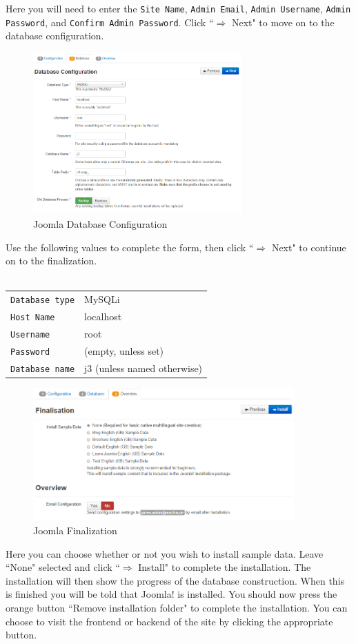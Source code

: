 \documentclass[]{report}
\begin{document}
\noindent
Here you will need to enter the \texttt{Site Name}, \texttt{Admin Email}, \texttt{Admin Username}, \texttt{Admin Password}, and \texttt{Confirm Admin Password}. Click ``$\Rightarrow$ Next" to move on to the database configuration.\\

\begin{figure}[h] 
	\centering
	\includegraphics[width=8cm]{j3databaseconfiguration.png}
	\caption{Joomla Database Configuration}
	\label{fig:j3databaseconfiguration}
\end{figure}

\noindent
Use the following values to complete the form, then click ``$\Rightarrow$ Next" to continue on to the finalization.\\
\\
\begin{tabular}{l l}
	\texttt{Database type} & MySQLi\\
	\texttt{Host Name} & localhost\\
	\texttt{Username} & root\\
	\texttt{Password} & (empty, unless set)\\
	\texttt{Database name} & j3 (unless named otherwise)\\
\end{tabular}

\newpage

\begin{figure}[h]
	\centering
	\includegraphics[width=10cm]{j3finalization.png}
	\caption{Joomla Finalization}
	\label{fig:j3finalization}
\end{figure}

\noindent
Here you can choose whether or not you wish to install sample data. Leave ``None" selected and click ``$\Rightarrow$ Install" to complete the installation. The installation will then show the progress of the database construction. When this is finished you will be told that Joomla! is installed. You should now press the orange button ``Remove installation folder" to complete the installation. You can choose to visit the frontend or backend of the site by clicking the appropriate button.
\end{document}
